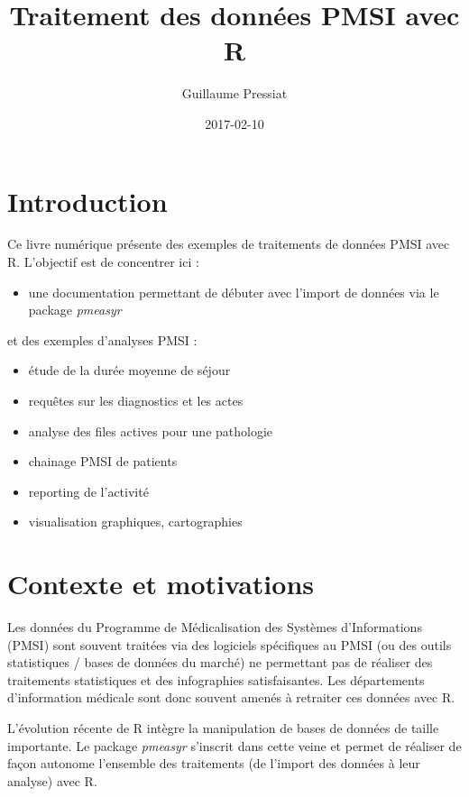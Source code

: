 \documentclass[]{book}
\title{Traitement des données PMSI avec R}
\author{Guillaume Pressiat}
\date{2017-02-10}
\providecommand{\tightlist}{%
  \setlength{\itemsep}{0pt}\setlength{\parskip}{0pt}}
\begin{document}
\maketitle

{
\setcounter{tocdepth}{1}
\tableofcontents
}
\chapter{Introduction}\label{introduction}

Ce livre numérique présente des exemples de traitements de données PMSI
avec R. L'objectif est de concentrer ici :

\begin{itemize}
\tightlist
\item
  une documentation permettant de débuter avec l'import de données via
  le package \emph{pmeasyr}
\end{itemize}

et des exemples d'analyses PMSI :

\begin{itemize}
\tightlist
\item
  étude de la durée moyenne de séjour
\item
  requêtes sur les diagnostics et les actes
\item
  analyse des files actives pour une pathologie
\item
  chainage PMSI de patients
\item
  reporting de l'activité
\item
  visualisation graphiques, cartographies
\end{itemize}

\chapter{Contexte et motivations}\label{contexte}

Les données du Programme de Médicalisation des Systèmes d'Informations
(PMSI) sont souvent traitées via des logiciels spécifiques au PMSI (ou
des outils statistiques / bases de données du marché) ne permettant pas
de réaliser des traitements statistiques et des infographies
satisfaisantes. Les départements d'information médicale sont donc
souvent amenés à retraiter ces données avec R.

L'évolution récente de R intègre la manipulation de bases de données de
taille importante. Le package \emph{pmeasyr} s'inscrit dans cette veine
et permet de réaliser de façon autonome l'ensemble des traitements (de
l'import des données à leur analyse) avec R.
\end{document}
